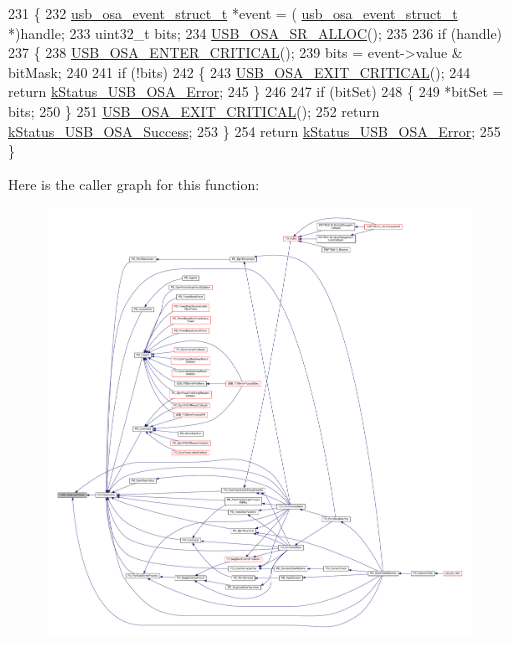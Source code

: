 \begin{DoxyCode}
231 \{
232     \hyperlink{struct__usb__osa__event__struct}{usb\_osa\_event\_struct\_t} *\textcolor{keyword}{event} = (
      \hyperlink{struct__usb__osa__event__struct}{usb\_osa\_event\_struct\_t} *)handle;
233     uint32\_t bits;
234     \hyperlink{usb__osa__bm_8h_a8dbccf46cc2f8e3b5cece6a4a84f7ae8}{USB\_OSA\_SR\_ALLOC}();
235 
236     \textcolor{keywordflow}{if} (handle)
237     \{
238         \hyperlink{usb__osa__bm_8h_a0485f70bf9c9a22f0340f014bc567362}{USB\_OSA\_ENTER\_CRITICAL}();
239         bits = \textcolor{keyword}{event}->value & bitMask;
240 
241         \textcolor{keywordflow}{if} (!bits)
242         \{
243             \hyperlink{usb__osa__bm_8h_a5b8053eca19b6df666a26fad3b07f953}{USB\_OSA\_EXIT\_CRITICAL}();
244             \textcolor{keywordflow}{return} \hyperlink{group__usb__os__abstraction_gga453ebd2f93aafb8c938c3a23c815f9bda40b794ea06e27b8ec1d67538f12eb350}{kStatus\_USB\_OSA\_Error};
245         \}
246 
247         \textcolor{keywordflow}{if} (bitSet)
248         \{
249             *bitSet = bits;
250         \}
251         \hyperlink{usb__osa__bm_8h_a5b8053eca19b6df666a26fad3b07f953}{USB\_OSA\_EXIT\_CRITICAL}();
252         \textcolor{keywordflow}{return} \hyperlink{group__usb__os__abstraction_gga453ebd2f93aafb8c938c3a23c815f9bdab90805fb75297fda1ca60dbb2283f933}{kStatus\_USB\_OSA\_Success};
253     \}
254     \textcolor{keywordflow}{return} \hyperlink{group__usb__os__abstraction_gga453ebd2f93aafb8c938c3a23c815f9bda40b794ea06e27b8ec1d67538f12eb350}{kStatus\_USB\_OSA\_Error};
255 \}
\end{DoxyCode}


Here is the caller graph for this function\-:
\nopagebreak
\begin{figure}[H]
\begin{center}
\leavevmode
\includegraphics[width=350pt]{group__usb__os__abstraction_gab25fb5d93d3b665ca8eadf2a670d3361_icgraph}
\end{center}
\end{figure}


